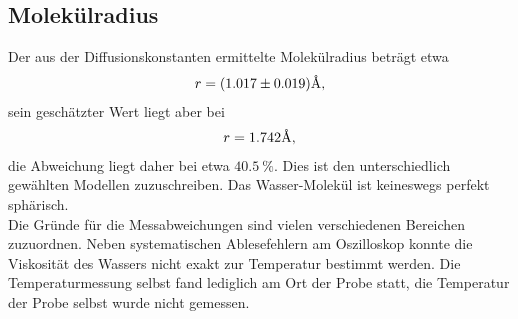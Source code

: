 \subsection{Molekülradius}
Der aus der Diffusionskonstanten ermittelte Molekülradius beträgt etwa
\begin{align*}
 r = (1.017\pm 0.019) \text{\r{A}},
\end{align*}
\noindent sein geschätzter Wert liegt aber bei
\begin{align*}
 r = 1.742 \text{\r{A}},
\end{align*}
\noindent die Abweichung liegt daher bei etwa $\SI{40.5}{\percent}$. Dies ist den unterschiedlich gewählten Modellen zuzuschreiben. Das Wasser-Molekül ist keineswegs perfekt sphärisch. \\
\noindent Die Gründe für die Messabweichungen sind vielen verschiedenen
Bereichen zuzuordnen. Neben systematischen Ablesefehlern am Oszilloskop konnte
die Viskosität des Wassers nicht exakt zur Temperatur bestimmt werden. Die
Temperaturmessung selbst fand lediglich am Ort der Probe statt, die Temperatur
der Probe selbst wurde nicht gemessen.
